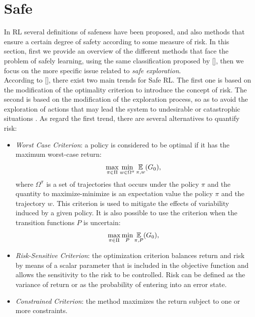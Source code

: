 \section{Safe }\label{sec:saferl}
In \ac{RL} several definitions of safeness have been proposed, and also methods that ensure a certain degree of safety according to some measure of risk. In this section, first we provide an overview of the different methods that face the problem of safely learning, using the same classification proposed by [\citeauthor{JMLR:v16:garcia15a}], then we focus on the more specific issue related to \emph{safe exploration}.\\
\newline
According to [\cite{JMLR:v16:garcia15a}], there exist two main trends for Safe \ac{RL}. The first one is based on the modification of the optimality criterion to introduce the concept of risk. The second is based on the modification of the exploration process, so as to avoid the exploration of actions that may lead the system to undesirable or catastrophic situations . As regard the first trend, there are several alternatives to quantify risk:
\begin{itemize}
	\item \emph{Worst Case Criterion}: a policy is considered to be optimal if it has the maximum worst-case return:
	\begin{align}
	\max_{\pi \in \Pi}\min_{w \in \Omega^{\pi}} \operatorname*{\mathbb{E}}_{\pi, w}(G_{0}),
	\end{align}
	where $\Omega^{\pi}$ is a set of trajectories that occurs under the policy $\pi$ and the quantity to maximize-minimize is an expectation value \wrt the policy $\pi$ and the trajectory $w$.	This criterion is used to mitigate the effects of variability induced by a given policy. It is also possible to use the criterion when the transition functions $P$ is uncertain:
	\begin{align}
	\max_{\pi \in \Pi}\min_{P} \operatorname*{\mathbb{E}}_{\pi, P}(G_{0}),
	\end{align}
	\item \emph{Risk-Sensitive Criterion}: the optimization criterion balances return and risk by means of a scalar parameter that is included in the objective function and allows the sensitivity to the risk to be controlled. Risk can be defined as the variance of return or as the probability of entering into an error state.
	\item \emph{Constrained Criterion}: the method maximizes the return subject to one or more constraints.
\end{itemize}
